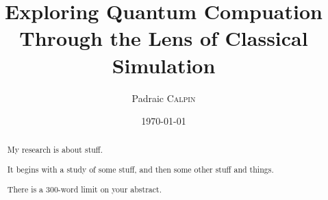 

\title{Exploring Quantum Compuation Through the Lens of Classical Simulation}
\author{Padraic \textsc{Calpin}}
\date{\today}

\maketitle
\makedeclaration

\begin{abstract} %
My research is about stuff.

It begins with a study of some stuff, and then some other stuff and things.

There is a 300-word limit on your abstract.
\end{abstract}

